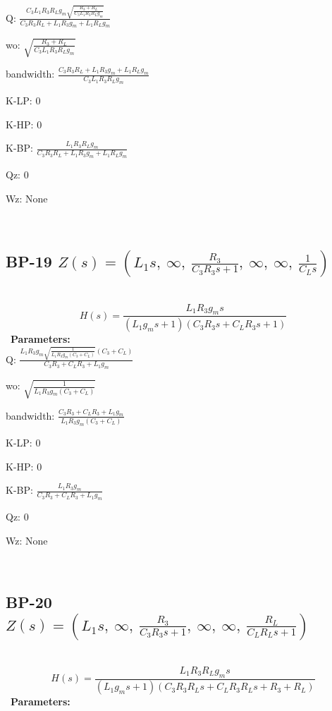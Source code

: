 \documentclass{article}
\begin{document}
Q: $\frac{C_{3} L_{1} R_{3} R_{L} g_{m} \sqrt{\frac{R_{3} + R_{L}}{C_{3} L_{1} R_{3} R_{L} g_{m}}}}{C_{3} R_{3} R_{L} + L_{1} R_{3} g_{m} + L_{1} R_{L} g_{m}}$\ 

wo: $\sqrt{\frac{R_{3} + R_{L}}{C_{3} L_{1} R_{3} R_{L} g_{m}}}$\ 

bandwidth: $\frac{C_{3} R_{3} R_{L} + L_{1} R_{3} g_{m} + L_{1} R_{L} g_{m}}{C_{3} L_{1} R_{3} R_{L} g_{m}}$\ 

K-LP: $0$\ 

K-HP: $0$\ 

K-BP: $\frac{L_{1} R_{3} R_{L} g_{m}}{C_{3} R_{3} R_{L} + L_{1} R_{3} g_{m} + L_{1} R_{L} g_{m}}$\ 

Qz: $0$\ 

Wz: $\text{None}$\ 

\ 

\subsection{BP-19 $Z(s) = \left( L_{1} s, \  \infty, \  \frac{R_{3}}{C_{3} R_{3} s + 1}, \  \infty, \  \infty, \  \frac{1}{C_{L} s}\right)$ } \ 
\textbf{\[H(s) = \frac{L_{1} R_{3} g_{m} s}{\left(L_{1} g_{m} s + 1\right) \left(C_{3} R_{3} s + C_{L} R_{3} s + 1\right)}\] } \ 
\textbf{Parameters:}\\ 

Q: $\frac{L_{1} R_{3} g_{m} \sqrt{\frac{1}{L_{1} R_{3} g_{m} \left(C_{3} + C_{L}\right)}} \left(C_{3} + C_{L}\right)}{C_{3} R_{3} + C_{L} R_{3} + L_{1} g_{m}}$\ 

wo: $\sqrt{\frac{1}{L_{1} R_{3} g_{m} \left(C_{3} + C_{L}\right)}}$\ 

bandwidth: $\frac{C_{3} R_{3} + C_{L} R_{3} + L_{1} g_{m}}{L_{1} R_{3} g_{m} \left(C_{3} + C_{L}\right)}$\ 

K-LP: $0$\ 

K-HP: $0$\ 

K-BP: $\frac{L_{1} R_{3} g_{m}}{C_{3} R_{3} + C_{L} R_{3} + L_{1} g_{m}}$\ 

Qz: $0$\ 

Wz: $\text{None}$\ 

\ 

\subsection{BP-20 $Z(s) = \left( L_{1} s, \  \infty, \  \frac{R_{3}}{C_{3} R_{3} s + 1}, \  \infty, \  \infty, \  \frac{R_{L}}{C_{L} R_{L} s + 1}\right)$ } \ 
\textbf{\[H(s) = \frac{L_{1} R_{3} R_{L} g_{m} s}{\left(L_{1} g_{m} s + 1\right) \left(C_{3} R_{3} R_{L} s + C_{L} R_{3} R_{L} s + R_{3} + R_{L}\right)}\] } \ 
\textbf{Parameters:}\\ 
\end{document}
